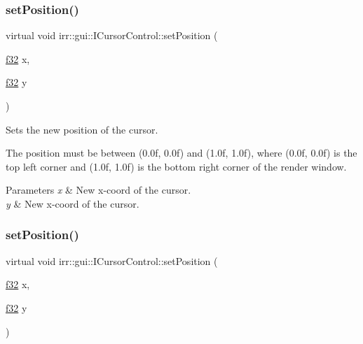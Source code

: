 \subsubsection{\texorpdfstring{set\+Position()}{setPosition()}\hspace{0.1cm}{\footnotesize\ttfamily [3/8]}}
{\footnotesize\ttfamily virtual void irr\+::gui\+::\+I\+Cursor\+Control\+::set\+Position (\begin{DoxyParamCaption}\item[{\hyperlink{namespaceirr_a0277be98d67dc26ff93b1a6a1d086b07}{f32}}]{x,  }\item[{\hyperlink{namespaceirr_a0277be98d67dc26ff93b1a6a1d086b07}{f32}}]{y }\end{DoxyParamCaption})\hspace{0.3cm}{\ttfamily [pure virtual]}}



Sets the new position of the cursor. 

The position must be between (0.\+0f, 0.\+0f) and (1.\+0f, 1.\+0f), where (0.\+0f, 0.\+0f) is the top left corner and (1.\+0f, 1.\+0f) is the bottom right corner of the render window. 
\begin{DoxyParams}{Parameters}
{\em x} & New x-\/coord of the cursor. \\
\hline
{\em y} & New x-\/coord of the cursor. \\
\hline
\end{DoxyParams}
\mbox{\label{classirr_1_1gui_1_1ICursorControl_adca41054684f73435c9b045520f7c83b}} 
\subsubsection{\texorpdfstring{set\+Position()}{setPosition()}\hspace{0.1cm}{\footnotesize\ttfamily [4/8]}}
{\footnotesize\ttfamily virtual void irr\+::gui\+::\+I\+Cursor\+Control\+::set\+Position (\begin{DoxyParamCaption}\item[{\hyperlink{namespaceirr_a0277be98d67dc26ff93b1a6a1d086b07}{f32}}]{x,  }\item[{\hyperlink{namespaceirr_a0277be98d67dc26ff93b1a6a1d086b07}{f32}}]{y }\end{DoxyParamCaption})\hspace{0.3cm}{\ttfamily [pure virtual]}}



